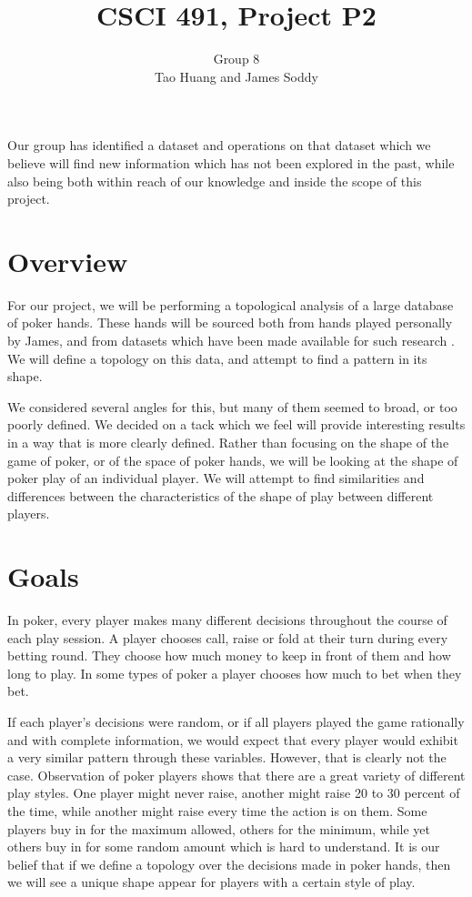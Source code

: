 \documentclass[11pt]{article}
\title{CSCI 491, Project P2}
\author{Group 8\\
		\small{Tao Huang and James Soddy}}
\begin{document}
\maketitle

Our group has identified a dataset and operations on that dataset which we believe
will find new information which has not been explored in the past, while also being
both within reach of our knowledge and inside the scope of this project.

\section*{Overview}
For our project, we will be performing a topological analysis of a large database
of poker hands. These hands will be sourced both from hands played personally by
James, and from datasets which have been made available for such research
\cite{PHHData}. We will define a topology on this data, and attempt to find a
pattern in its shape.

We considered several angles for this, but many of them seemed to broad, or too
poorly defined. We decided on a tack which we feel will provide interesting results
in a way that is more clearly defined. Rather than focusing on the shape of the
game of poker, or of the space of poker hands, we will be looking at the shape of
poker play of an individual player. We will attempt to find similarities and differences
between the characteristics of the shape of play between different players.

\section*{Goals}
In poker, every player makes many different decisions throughout the course of each
play session. A player chooses call, raise or fold at their turn during every betting
round. They choose how much money to keep in front of them and how long to play. In
some types of poker a player chooses how much to bet when they bet.

If each player's decisions were random, or if all players played the game rationally
and with complete information, we would expect that every player would exhibit a very
similar pattern through these variables. However, that is clearly not the case.
Observation of poker players shows that there are a great variety of different
play styles. One player might never raise, another might raise 20 to 30 percent of
the time, while another might raise every time the action is on them. Some
players buy in for the maximum allowed, others for the minimum, while yet
others buy in for some random amount which is hard to understand. It is our belief
that if we define a topology over the decisions made in poker hands, then we
will see a unique shape appear for players with a certain style of play.
\end{document}
